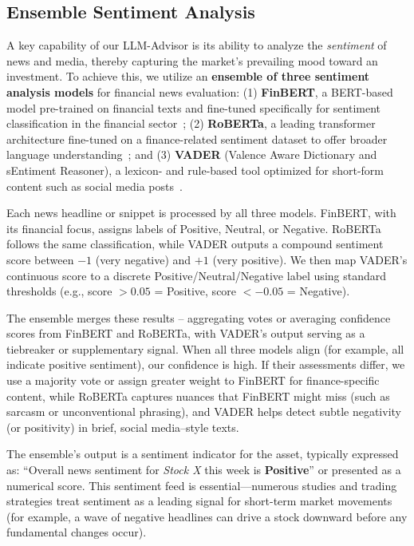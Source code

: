 \documentclass[conference]{IEEEtran}
\begin{document}
\subsection{Ensemble Sentiment Analysis}

A key capability of our LLM-Advisor is its ability to analyze the \textit{sentiment} of news and media, thereby capturing the market’s prevailing mood toward an investment. To achieve this, we utilize an \textbf{ensemble of three sentiment analysis models} for financial news evaluation: (1) \textbf{FinBERT}, a BERT-based model pre-trained on financial texts and fine-tuned specifically for sentiment classification in the financial sector~\cite{b3}; (2) \textbf{RoBERTa}, a leading transformer architecture fine-tuned on a finance-related sentiment dataset to offer broader language understanding~\cite{b4}; and (3) \textbf{VADER} (Valence Aware Dictionary and sEntiment Reasoner), a lexicon- and rule-based tool optimized for short-form content such as social media posts~\cite{b5}.

Each news headline or snippet is processed by all three models. FinBERT, with its financial focus, assigns labels of Positive, Neutral, or Negative. RoBERTa follows the same classification, while VADER outputs a compound sentiment score between $-1$ (very negative) and $+1$ (very positive). We then map VADER’s continuous score to a discrete Positive/Neutral/Negative label using standard thresholds (e.g., score $>0.05$ = Positive, score $< -0.05$ = Negative).

The ensemble merges these results -- aggregating votes or averaging confidence scores from FinBERT and RoBERTa, with VADER’s output serving as a tiebreaker or supplementary signal. When all three models align (for example, all indicate positive sentiment), our confidence is high. If their assessments differ, we use a majority vote or assign greater weight to FinBERT for finance-specific content, while RoBERTa captures nuances that FinBERT might miss (such as sarcasm or unconventional phrasing), and VADER helps detect subtle negativity (or positivity) in brief, social media–style texts.

The ensemble’s output is a sentiment indicator for the asset, typically expressed as: ``Overall news sentiment for \textit{Stock X} this week is \textbf{Positive}'' or presented as a numerical score. This sentiment feed is essential—numerous studies and trading strategies treat sentiment as a leading signal for short-term market movements (for example, a wave of negative headlines can drive a stock downward before any fundamental changes occur).
\end{document}
